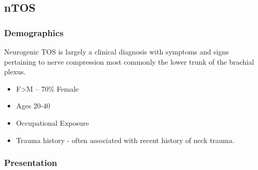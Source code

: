 \documentclass[
]{book}
\begin{document}
\hypertarget{ntos}{%
\subsection{nTOS}\label{ntos}}

\hypertarget{demographics-1}{%
\subsubsection{Demographics}\label{demographics-1}}

Neurogenic TOS is largely a clinical diagnosis with symptoms and signs
pertaining to nerve compression most commonly the lower trunk of the
brachial plexus.

\begin{itemize}
\item
  F\textgreater M -- 70\% Female
\item
  Ages 20-40
\item
  Occupational Exposure
\item
  Trauma history - often associated with recent history of neck
  trauma.
\end{itemize}

\hypertarget{presentation-8}{%
\subsubsection{Presentation}\label{presentation-8}}
\end{document}
